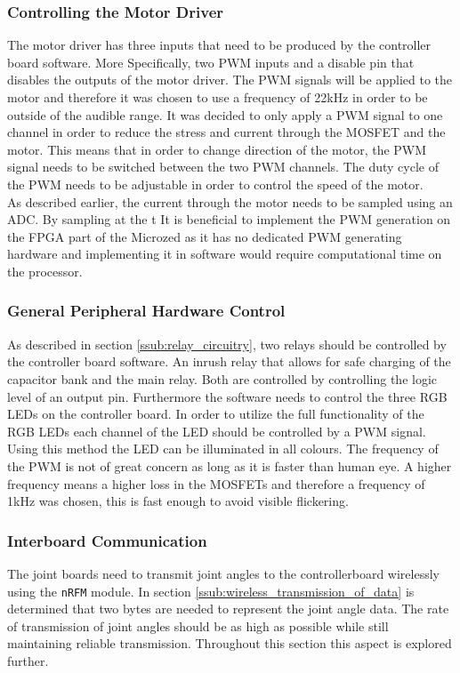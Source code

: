 \subsubsection{Controlling the Motor Driver} %
\label{ssub:controlling_the_motor_driver}
The motor driver has three inputs that need to be produced by the controller board software.
More Specifically, two PWM inputs and a disable pin that disables the outputs of the motor driver.
The PWM signals will be applied to the motor and therefore it was chosen to use a frequency of 22kHz in order to be outside of the audible range.
It was decided to only apply a PWM signal to one channel in order to reduce the stress and current through the MOSFET and the motor.
This means that in order to change direction of the motor, the PWM signal needs to be switched between the two PWM channels.
The duty cycle of the PWM needs to be adjustable in order to control the speed of the motor.
\\
As described earlier, the current through the motor needs to be sampled using an ADC. 
By sampling at the t
It is beneficial to implement the PWM generation on the FPGA part of the Microzed as it has no dedicated PWM generating hardware and implementing it in software would require computational time on the processor.

\subsubsection{General Peripheral Hardware Control} %
\label{ssub:general_peripheral_hardware}
As described in section \ref{ssub:relay_circuitry}, two relays should be controlled by the controller board software. 
An inrush relay that allows for safe charging of the capacitor bank and the main relay. 
Both are controlled by controlling the logic level of an output pin.
Furthermore the software needs to control the three RGB LEDs on the controller board. 
In order to utilize the full functionality of the RGB LEDs each channel of the LED should be controlled by a PWM signal.
Using this method the LED can be illuminated in all colours.
The frequency of the PWM is not of great concern as long as it is faster than human eye. 
A higher frequency means a higher loss in the MOSFETs and therefore a frequency of 1kHz was chosen, this is fast enough to avoid visible flickering.

\subsubsection{Interboard Communication} %
\label{ssub:interboard_communication}
The joint boards need to transmit joint angles to the controllerboard wirelessly using the \texttt{nRFM} module.
In section  \ref{ssub:wireless_transmission_of_data} is determined that two bytes are needed to represent the joint angle data.
The rate of transmission of joint angles should be as high as possible while still maintaining reliable transmission.
Throughout this section this aspect is explored further.

